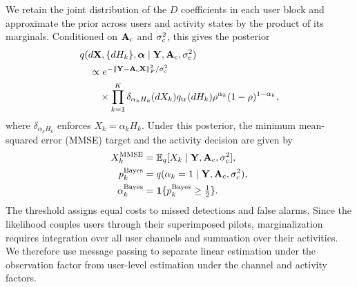We retain the joint distribution of the $D$ coefficients in each user
block and approximate the prior across users and activity states by
the product of its marginals. Conditioned on $\mathbf A_{\rm c}$ and
$\sigma_{\rm c}^2$, this gives the posterior
\begin{equation}
 \begin{aligned}
 &q(d\mathbf X,\{dH_k\},\bm\alpha\mid
 \mathbf Y,\mathbf A_{\rm c},\sigma_{\rm c}^2)\\
 &\quad\propto
 e^{-\left\lVert\mathbf Y-\mathbf A_{\rm c}\mathbf X\right\rVert_F^2/\sigma_{\rm c}^2}\\
 &\qquad\times\prod_{k=1}^{K}
 \delta_{\alpha_kH_k}(dX_k)q_{\rm tr}(dH_k)
 \rho^{\alpha_k}(1-\rho)^{1-\alpha_k},
 \end{aligned}
 \label{eq:working-posterior}
\end{equation}
where $\delta_{\alpha_kH_k}$ enforces $X_k=\alpha_kH_k$.
Under this posterior, the minimum mean-squared error (MMSE) target
and the activity decision are given by
\begin{equation}
 \begin{aligned}
 X_k^{\rm MMSE}&=\mathbb{E}_q[X_k\mid\mathbf Y,\mathbf A_{\rm c},\sigma_{\rm c}^2],\\
 p_k^{\rm Bayes}&=q(\alpha_k=1\mid\mathbf Y,\mathbf A_{\rm c},\sigma_{\rm c}^2),\\
 \alpha_k^{\rm Bayes}&=\mathbf1\{p_k^{\rm Bayes}\geq\tfrac12\}.
 \end{aligned}
 \label{eq:targets}
\end{equation}
The threshold assigns equal costs to missed detections and false
alarms. Since the likelihood couples users through their superimposed
pilots, marginalization requires integration over all user channels
and summation over their activities. We therefore use message passing
to separate linear estimation under the observation factor from
user-level estimation under the channel and activity factors.
